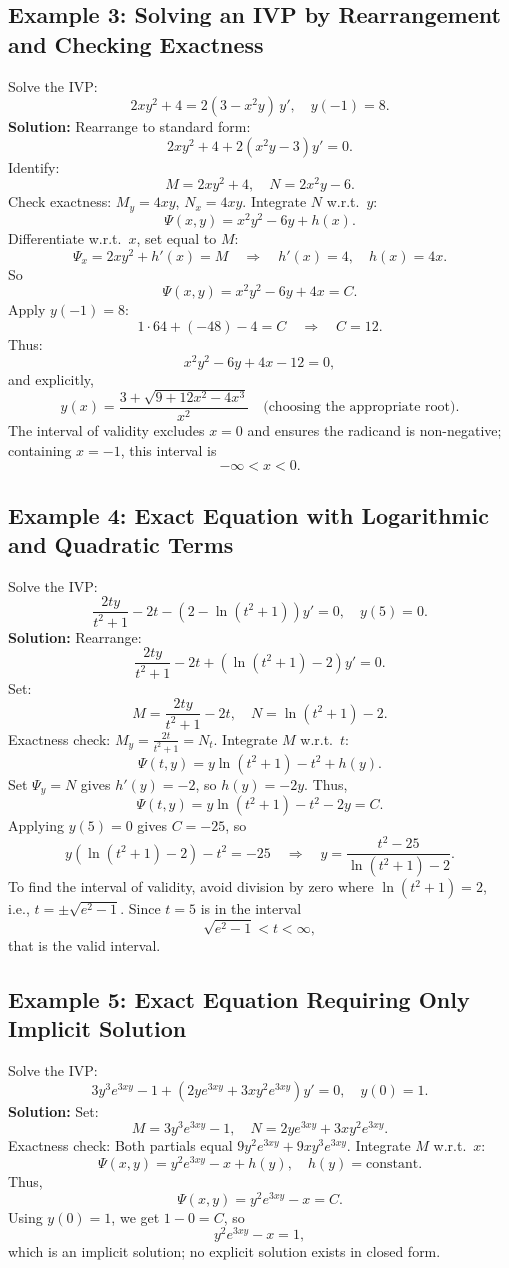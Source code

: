 \documentclass[12pt]{book}
\begin{document}
\subsection*{Example 3: Solving an IVP by Rearrangement and Checking Exactness}
Solve the IVP:
\[
2xy^2 + 4 = 2(3 - x^2 y)\,y', \quad y(-1) = 8.
\]
\textbf{Solution:}
Rearrange to standard form:
\[
2xy^2 + 4 + 2(x^2y - 3)y' = 0.
\]
Identify:
\[
M = 2xy^2 + 4,\quad N = 2x^2y - 6.
\]
Check exactness: \(M_y = 4xy\), \(N_x = 4xy\).  
Integrate \(N\) w.r.t.\ \(y\):
\[
\Psi(x,y) = x^2y^2 - 6y + h(x).
\]
Differentiate w.r.t.\ \(x\), set equal to \(M\):
\[
\Psi_x = 2xy^2 + h'(x) = M \quad\Longrightarrow\quad h'(x) = 4,\quad h(x) = 4x.
\]
So
\[
\Psi(x,y) = x^2y^2 - 6y + 4x = C.
\]
Apply \(y(-1)=8\):
\[
1\cdot64 + (-48) - 4 = C \quad\Longrightarrow\quad C = 12.
\]
Thus:
\[
x^2y^2 - 6y + 4x - 12 = 0,
\]
and explicitly,
\[
y(x) = \frac{3 + \sqrt{9 + 12x^2 - 4x^3}}{x^2} \quad\text{(choosing the appropriate root)}.
\]
The interval of validity excludes \(x=0\) and ensures the radicand is non-negative; containing \(x = -1\), this interval is
\[
-\infty < x < 0.
\]

\subsection*{Example 4: Exact Equation with Logarithmic and Quadratic Terms}
Solve the IVP:
\[
\frac{2ty}{t^2 + 1} - 2t - \left(2 - \ln(t^2 + 1)\right)y' = 0,\quad y(5) = 0.
\]
\textbf{Solution:}
Rearrange:
\[
\frac{2ty}{t^2 + 1} - 2t + (\ln(t^2 + 1) - 2)y' = 0.
\]
Set:
\[
M = \frac{2ty}{t^2 + 1} - 2t, \quad N = \ln(t^2 + 1) - 2.
\]
Exactness check: \(M_y = \frac{2t}{t^2 + 1} = N_t\).  
Integrate \(M\) w.r.t.\ \(t\):
\[
\Psi(t,y) = y\ln(t^2 + 1) - t^2 + h(y).
\]
Set \(\Psi_y = N\) gives \(h'(y) = -2\), so \(h(y) = -2y\).  
Thus,
\[
\Psi(t,y) = y\ln(t^2 + 1) - t^2 - 2y = C.
\]
Applying \(y(5)=0\) gives \(C = -25\), so
\[
y\left(\ln(t^2 + 1) - 2\right) - t^2 = -25
\quad\Longrightarrow\quad
y = \frac{t^2 - 25}{\ln(t^2 + 1) - 2}.
\]
To find the interval of validity, avoid division by zero where \(\ln(t^2 + 1) = 2\), i.e., \(t = \pm\sqrt{e^2 - 1}\). Since \(t = 5\) is in the interval
\[
\sqrt{e^2 - 1} < t < \infty,
\]
that is the valid interval.

\subsection*{Example 5: Exact Equation Requiring Only Implicit Solution}
Solve the IVP:
\[
3y^3 e^{3xy} - 1 + \left(2y e^{3xy} + 3x y^2 e^{3xy}\right)y' = 0,\quad y(0) = 1.
\]
\textbf{Solution:}
Set:
\[
M = 3y^3 e^{3xy} - 1,\quad N = 2y e^{3xy} + 3x y^2 e^{3xy}.
\]
Exactness check: Both partials equal \(9y^2 e^{3xy} + 9xy^3 e^{3xy}\).  
Integrate \(M\) w.r.t.\ \(x\):
\[
\Psi(x,y) = y^2 e^{3xy} - x + h(y),\quad h(y) = \text{constant}.
\]
Thus,
\[
\Psi(x,y) = y^2 e^{3xy} - x = C.
\]
Using \(y(0)=1\), we get \(1 - 0 = C\), so
\[
y^2 e^{3xy} - x = 1,
\]
which is an implicit solution; no explicit solution exists in closed form.
\end{document}
